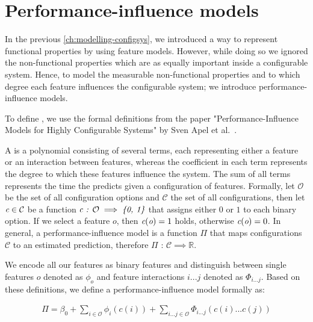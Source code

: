 \section{Performance-influence models}\label{ch:performance-influence-models}
In the previous \autoref{ch:modelling-configsys}, we introduced a way to represent functional properties by using feature models.
However, while doing so we ignored the non-functional properties which are as equally important inside a configurable system.
Hence, to model the measurable non-functional properties and to which degree each feature influences the configurable system; 
we introduce performance-influence models. 

To define {\perfInfluenceModel}, we use the formal definitions from the paper "Performance-Influence Models for
Highly Configurable Systems" by Sven Apel et al.~\cite{Performance-influence-models-for-highly-configurable-systems}.

A {\perfInfluenceModel} is a polynomial consisting of several terms, each representing either a feature or an interaction between features, 
whereas the coefficient in each term represents the degree to which these features influence the system.  
The sum of all terms represents the time the {\perfInfluenceModel} predicts given a configuration of features.
Formally, let $\mathcal{O}$ be the set of all configuration options and $\mathcal{C}$ the set of all configurations, 
then let $\emph{c} \in \mathcal{C}$ be a function $\emph{c} \textit{ : } \mathcal{O} \implies \emph{\{0, 1\}}$ that assigns either $0$ or $1$ to each binary option. 
If we select a feature $o$, then $\emph{c}(\emph{o}) = 1$ holds, otherwise $\emph{c}(\emph{o}) = 0$. 
In general, a performance-influence model is a function $\Pi$ that maps configurations $\mathcal{C}$ to an estimated prediction, 
therefore $\Pi \textit{ : } \mathcal{C} \implies \mathbb{R}$.

We encode all our features as binary features and distinguish between single features $o$ denoted as $\phi_o$ and feature interactions $i ... j$ denoted as $\Phi_{i...j}$. 
Based on these definitions, we define a performance-influence model formally as:

\begin{gather}
    \Pi = \beta_0 + \sum_{i \in \mathcal{O}} \phi_i(c(i)) + \sum_{i...j \in \mathcal{O}} \Phi_{i...j}(c(i)...c(j))
\end{gather}


